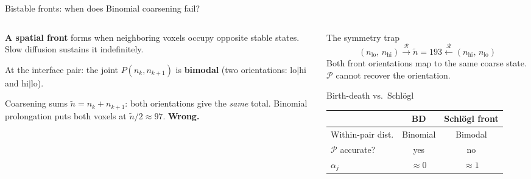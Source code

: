 \documentclass[10pt,aspectratio=169]{beamer}
\newcommand{\calR}{\mathcal{R}}
\newcommand{\calP}{\mathcal{P}}
\begin{document}

\begin{frame}{Bistable fronts: when does Binomial coarsening fail?}

  \begin{columns}[T]
    \begin{column}{0.46\textwidth}
      \textbf{A spatial front} forms when neighboring voxels occupy opposite stable states.
      Slow diffusion sustains it indefinitely.

      \medskip

      \medskip
      At the interface pair: the joint $P(n_k,n_{k+1})$ is \textbf{bimodal}
      (two orientations: lo$|$hi and hi$|$lo).

      \vspace{0.5em}
      Coarsening sums $\tilde n = n_k + n_{k+1}$: both orientations give the \emph{same} total.
      Binomial prolongation puts both voxels at $\tilde n/2 \approx 97$.
      \textbf{Wrong.}

    \end{column}
    \begin{column}{0.50\textwidth}
      \vspace{0.3em}
      \begin{block}{The symmetry trap}
        \[
          (n_\text{lo},\,n_\text{hi}) \xrightarrow{\calR} \tilde n = 193
          \xleftarrow{\calR} (n_\text{hi},\,n_\text{lo})
        \]
        Both front orientations map to the same coarse state.
        $\calP$ cannot recover the orientation.
      \end{block}

      \vspace{0.4em}
      \begin{block}{Birth-death vs.\ Schl\"{o}gl}
        \begin{tabular}{@{}lcc@{}}
          & BD & Schl\"{o}gl front \\
          \midrule
          Within-pair dist. & Binomial & Bimodal \\
          $\calP$ accurate? & yes & no \\
          $\alpha_j$ & $\approx 0$ & $\approx 1$ \\
        \end{tabular}
      \end{block}
    \end{column}
  \end{columns}


\end{frame}
\end{document}
